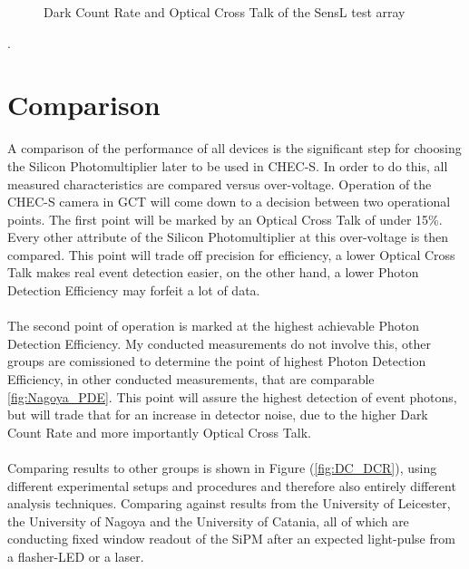 \documentclass[article,type=msc,colorback,accentcolor=tud9c]{tudthesis}
\begin{document}
\begin{figure}[h]
\begin{centering}
\caption{Dark Count Rate and Optical Cross Talk of the SensL test array}
\label{fig:SensLDCROCT}
\end{centering}
\end{figure}
.






\newpage
\section{Comparison}
A comparison of the performance of all devices is the significant step for choosing the Silicon Photomultiplier later to be used in CHEC-S. In order to do this, all measured characteristics are compared versus over-voltage. Operation of the CHEC-S camera in GCT will come down to a decision between two operational points. The first point will be marked by an Optical Cross Talk of under 15\%. Every other attribute of the Silicon Photomultiplier at this over-voltage is then compared. This point will trade off precision for efficiency, a lower Optical Cross Talk makes real event detection easier, on the other hand, a lower Photon Detection Efficiency may forfeit a lot of data.
\\\\
The second point of operation is marked at the highest achievable Photon Detection Efficiency. My conducted measurements do not involve this, other groups are comissioned to determine the point of highest Photon Detection Efficiency, in other conducted measurements, that are comparable \ref{fig:Nagoya_PDE}. This point will assure the highest detection of event photons, but will trade that for an increase in detector noise, due to the higher Dark Count Rate and more importantly Optical Cross Talk.\\\\
Comparing results to other groups is shown in Figure (\ref{fig:DC_DCR}), using different experimental setups and procedures and therefore also entirely different analysis techniques. Comparing against results from the University of Leicester, the University of Nagoya and the University of Catania, all of which are conducting fixed window readout of the SiPM after an expected light-pulse from a flasher-LED or a laser. 
\end{document}
